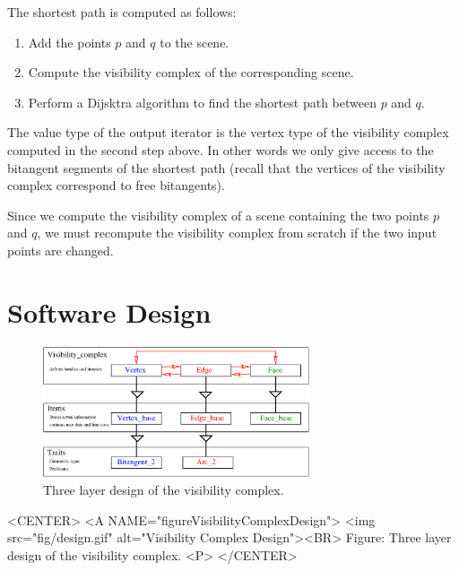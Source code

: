 The shortest path is computed as follows:
\begin{enumerate}
    \item Add the points $p$ and $q$ to the scene.
    \item Compute the visibility complex of the corresponding scene.
    \item Perform a Dijsktra algorithm to find the shortest path between $p$ and
    $q$.
\end{enumerate}
The value type of the output iterator is the vertex type of the visibility
complex computed in the second step above. In other words we only give access to
the bitangent segments of the shortest path (recall that the vertices of the
visibility complex correspond to free bitangents). 

Since we compute the visibility complex of a scene containing the two points $p$
and $q$, we must recompute the visibility complex from scratch if the two input
points are changed.

\section{Software Design}
\begin{ccTexOnly}
  \begin{figure}
    \begin{center}
      \parbox{0.7\textwidth}{%
          \includegraphics[width=0.7\textwidth]{fig/design.eps}%
      }
    \end{center}
    \caption{Three layer design of the visibility complex.}
    \label{figureVisibilityComplexDesign}
  \end{figure}
\end{ccTexOnly}

\begin{ccHtmlOnly}
    <CENTER>
    <A NAME="figureVisibilityComplexDesign">
        <img src="fig/design.gif"
         alt="Visibility Complex Design"><BR>
    Figure: Three layer design of the visibility complex.
    <P>
    </CENTER>
\end{ccHtmlOnly}

